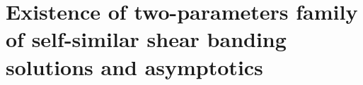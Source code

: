 \documentclass[a4paper,11pt]{article}
\begin{document}
\section{Existence of two-parameters family of self-similar shear banding solutions and asymptotics}
% 
% 
\end{document}
